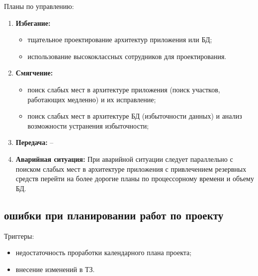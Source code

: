 \documentclass[a4paper,14pt]{extarticle}
\begin{document}
Планы по управлению:
\begin{enumerate}
    \item \textbf{Избегание:}
    \begin{itemize}
        \item тщательное проектирование архитектур приложения или БД;
        \item использование высококлассных сотрудников для проектирования.
    \end{itemize}

    \item \textbf{Смягчение:}
    \begin{itemize}
        \item поиск слабых мест в архитектуре приложения (поиск участков,
              работающих медленно) и их исправление;
        \item поиск слабых мест в архитектуре БД (избыточности данных) и анализ
              возможности устранения избыточности;
    \end{itemize}

    \item \textbf{Передача:} --

    \item \textbf{Аварийная ситуация:} При аварийной ситуации следует
          параллельно с поиском слабых мест в архитектуре приложения с
          привлечением резервных средств перейти на более дорогие планы
          по процессорному времени и объему БД.
\end{enumerate}

\subsection{ошибки при планировании работ по проекту}
Триггеры:
\begin{itemize}
    \item недостаточность проработки календарного плана проекта;
    \item внесение изменений в ТЗ.
\end{itemize}
\end{document}
